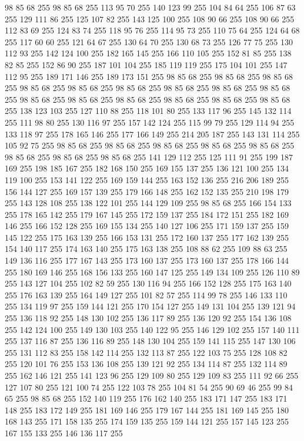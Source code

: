 98 85 68 255 98 85 68 255 113 95 70 255 140 123 99 255 104 84 64 255 106 87 63 255 129 111 86 255 125 107 82 255 143 125 100 255 108 90 66 255 108 90 66 255 112 83 69 255 124 83 74 255 118 95 76 255 114 95 73 255 110 75 64 255 124 64 68 255 117 60 60 255 121 64 67 255 130 64 70 255 130 68 73 255 126 77 75 255 130 112 93 255 142 124 100 255 182 165 145 255 166 110 105 255 152 81 85 255 138 82 85 255 152 86 90 255 187 101 104 255 185 119 119 255 175 104 101 255 147 112 95 255 189 171 146 255 189 173 151 255 98 85 68 255 98 85 68 255 98 85 68 255 98 85 68 255 98 85 68 255 98 85 68 255 98 85 68 255 98 85 68 255 98 85 68 255 98 85 68 255 98 85 68 255 98 85 68 255 98 85 68 255 98 85 68 255 98 85 68 255 138 123 103 255 127 110 88 255 118 101 80 255 133 117 96 255 145 132 114 255 111 98 80 255 130 116 97 255 157 142 124 255 115 99 79 255 129 114 94 255 133 118 97 255 178 165 146 255 177 166 149 255 214 205 187 255
143 131 114 255 105 92 75 255 98 85 68 255 98 85 68 255 98 85 68 255 98 85 68 255 98 85 68 255 98 85 68 255 98 85 68 255 98 85 68 255 141 129 112 255 125 111 91 255 199 187 169 255 198 185 167 255 182 168 150 255 169 155 137 255 136 121 100 255 134 119 100 255 153 141 122 255 169 159 144 255 163 152 136 255 216 206 189 255 156 144 127 255 169 157 139 255 179 166 148 255 162 152 135 255 210 198 179 255 143 128 108 255 138 122 101 255 144 129 109 255 98 85 68 255 166 154 133 255 178 165 142 255 179 167 145 255 172 159 137 255 184 172 151 255 182 169 146 255 166 152 128 255 169 155 134 255 140 127 106 255 171 159 137 255 159 145 122 255 175 163 139 255 166 153 131 255 172 160 137 255 177 162 139 255 154 140 117 255 174 163 140 255 175 163 138 255 108 88 62 255 109 88 63 255 149 136 116 255 177 167 143 255 173 160 137 255 173 160 137 255 178 166 144 255 180 169 146 255 168 156 133 255 160 147 125 255 149 134 109 255 126 110 89 255 143 127 104 255 102 82 59 255 130 116 94 255
166 152 128 255 175 163 140 255 176 163 139 255 164 149 127 255 101 82 57 255 114 99 78 255 146 133 110 255 134 119 97 255 159 144 121 255 170 154 127 255 149 131 104 255 139 121 94 255 136 118 92 255 148 130 102 255 136 117 89 255 136 120 92 255 154 136 108 255 142 124 100 255 149 130 103 255 140 122 95 255 146 129 102 255 157 140 111 255 137 116 87 255 136 116 89 255 148 130 104 255 159 141 115 255 147 130 106 255 131 112 83 255 158 142 114 255 132 113 87 255 122 103 75 255 128 108 82 255 120 101 76 255 153 136 108 255 139 121 92 255 134 114 87 255 132 114 89 255 162 146 121 255 141 123 96 255 129 109 80 255 129 109 83 255 111 92 66 255 127 107 80 255 121 100 74 255 122 103 78 255 104 81 54 255 90 69 46 255 99 84 65 255 98 85 68 255 152 140 119 255 176 162 140 255 183 171 147 255 183 171 148 255 183 172 149 255 181 169 146 255 179 167 144 255 181 169 145 255 180 168 143 255 171 158 135 255 174 159 135 255 159 144 121 255 157 145 123 255 167 155 133 255 146 136 117 255
